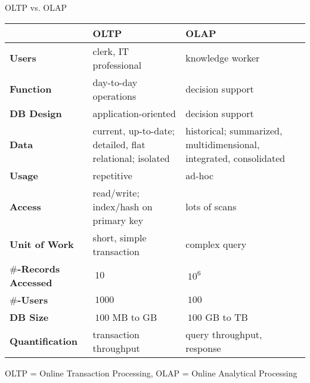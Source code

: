 \begin{frame}{OLTP vs. OLAP}
	\begin{tabularx}{\textwidth}{|b|X|X|}
		\rowcolor{faugray!62}          & \textbf{OLTP}                                            & \textbf{OLAP}                                                      \\\hline
		\textbf{Users}                 & clerk, IT professional                                   & knowledge worker                                                   \\ \hline
		\textbf{Function}              & day-to-day operations                                    & decision support                                                   \\ \hline
		\textbf{DB Design}             & application-oriented                                     & decision support                                                   \\ \hline
		\textbf{Data}                  & current, up-to-date; detailed, flat relational; isolated & historical; summarized, multidimensional, integrated, consolidated \\ \hline
		\textbf{Usage}                 & repetitive                                               & ad-hoc                                                             \\ \hline
		\textbf{Access}                & read/write; index/hash on primary key                    & lots of scans                                                      \\ \hline
		\textbf{Unit of Work}          & short, simple transaction                                & complex query                                                      \\ \hline
		\textbf{$\#$-Records Accessed} & $~ 10$                                                   & $~ 10^6$                                                           \\ \hline
		\textbf{$\#$-Users}            & $~ 1000$                                                 & $~ 100$                                                            \\ \hline
		\textbf{DB Size}               & $~ 100$ MB to GB                                         & $~ 100$ GB to TB                                                   \\ \hline
		\textbf{Quantification}        & transaction throughput                                   & query throughput, response                                         \\ \hline
	\end{tabularx}

	{\tiny OLTP = Online Transaction Processing, OLAP = Online Analytical Processing}
\end{frame}

